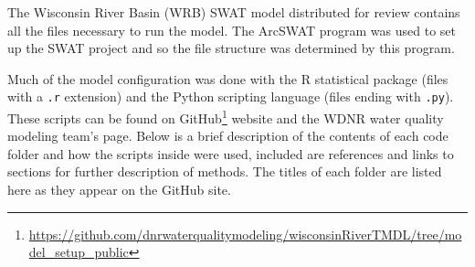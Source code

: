 \label{sec:model_data}
The Wisconsin River Basin (WRB) SWAT model distributed for review contains all the files necessary to run the model. The ArcSWAT program was used to set up the SWAT project and so the file structure was determined by this program. 

Much of the model configuration was done with the R statistical package (files with a \texttt{.r} extension) and the Python scripting language (files ending with \texttt{.py}). These scripts can be found on GitHub\footnote{\url{https://github.com/dnrwaterqualitymodeling/wisconsinRiverTMDL/tree/model_setup_public}} website and the WDNR water quality modeling team's page. Below is a brief description of the contents of each code folder and how the scripts inside were used, included are references and links to sections for further description of methods. The titles of each folder are listed here as they appear on the GitHub site.

